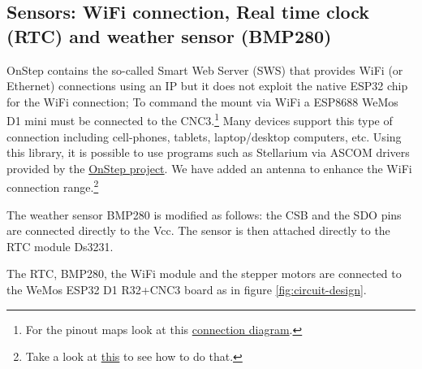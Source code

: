 \subsection{Sensors: WiFi connection, Real time clock (RTC) and weather sensor (BMP280)}
OnStep contains the so-called Smart Web Server (SWS) that provides WiFi (or Ethernet) connections using an IP but it does not exploit the native ESP32 chip for the WiFi connection;
To command the mount via WiFi a ESP8688 WeMos D1 mini must be connected to the CNC3.\footnote{For the pinout maps look at this \href{https://onstep.groups.io/g/main/wiki/19670}{connection diagram}.}
Many devices support this type of connection including cell-phones, tablets, laptop/desktop computers, etc.
Using this library, it is possible to use programs such as Stellarium via ASCOM drivers provided by the \href{http://www.stellarjourney.com/index.php?r=site/software_telescope}{OnStep project}.
We have added an antenna to enhance the WiFi connection range.\footnote{Take a look at \href{https://www.instructables.com/External-Antenna-for-ESP8266/}{this} to see how to do that.}

The weather sensor BMP280 is modified as follows: the CSB and the SDO pins are connected directly to the Vcc.
The sensor is then attached directly to the RTC module Ds3231.

The RTC, BMP280, the WiFi module and the stepper motors are connected to the WeMos ESP32 D1 R32+CNC3 board as in figure \ref{fig:circuit-design}.
